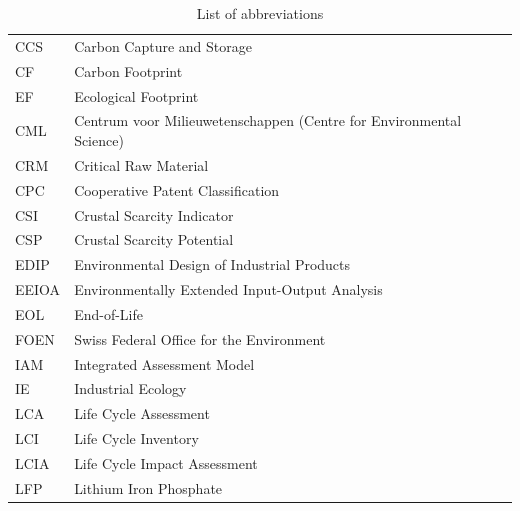 \documentclass[a4paper,fleqn]{cas-dc}
\begin{document}
\begin{table}[!htbp]
	\centering
	\caption{List of abbreviations}\label{tab:abbreviations}
	\begin{tabular}{ll}
		\toprule
		CCS	              & Carbon Capture and Storage                                          \\
		CF                & Carbon Footprint                                                    \\
		EF                & Ecological Footprint                                                \\
		CML               & Centrum voor Milieuwetenschappen (Centre for Environmental Science) \\
		CRM               & Critical Raw Material                                               \\
		CPC               & Cooperative Patent Classification                                   \\
		CSI               & Crustal Scarcity Indicator                                          \\
		CSP               & Crustal Scarcity Potential                                          \\
		EDIP              & Environmental Design of Industrial Products                         \\
		EEIOA             & Environmentally Extended Input-Output Analysis                      \\
		EOL               & End-of-Life                                                         \\
		FOEN              & Swiss Federal Office for the Environment                            \\
		IAM               & Integrated Assessment Model                                         \\
		IE                & Industrial Ecology                                                  \\
		LCA               & Life Cycle Assessment                                               \\
		LCI               & Life Cycle Inventory                                                \\
		LCIA              & Life Cycle Impact Assessment                                        \\
		LFP               & Lithium Iron Phosphate                                              \\

\end{tabular}
\end{table}
\end{document}
